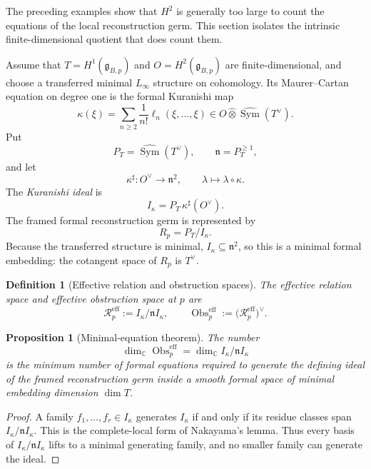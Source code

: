 \documentclass[11pt]{amsart}
\newtheorem{proposition}[theorem]{Proposition}
\newtheorem{definition}[theorem]{Definition}
\newcommand{\Obs}{\operatorname{Obs}}
\newcommand{\C}{\mathbb C}
\newcommand{\ghoch}{\mathfrak g}
\begin{document}
The preceding examples show that $H^2$ is generally too large to count the equations of the local reconstruction germ.  This section isolates the intrinsic finite-dimensional quotient that does count them.

Assume that $T=H^1(\ghoch_{B,p})$ and $O=H^2(\ghoch_{B,p})$ are finite-dimensional, and choose a transferred minimal $L_\infty$ structure on cohomology.  Its Maurer--Cartan equation on degree one is the formal Kuranishi map
\[
\kappa(\xi)
=
\sum_{n\ge2}\frac1{n!}\ell_n(\xi,\ldots,\xi)
\in O\widehat\otimes \widehat{\operatorname{Sym}}(T^\vee).
\]
Put
\[
P_T=\widehat{\operatorname{Sym}}(T^\vee),
\qquad
\mathfrak n=P_T^{\ge1},
\]
and let
\[
\kappa^\sharp:O^\vee\longrightarrow\mathfrak n^2,
\qquad
\lambda\longmapsto \lambda\circ\kappa.
\]
The \emph{Kuranishi ideal} is
\[
I_\kappa=P_T\,\kappa^\sharp(O^\vee).
\]
The framed formal reconstruction germ is represented by
\[
R_p=P_T/I_\kappa.
\]
Because the transferred structure is minimal, $I_\kappa\subseteq\mathfrak n^2$, so this is a minimal formal embedding: the cotangent space of $R_p$ is $T^\vee$.

\begin{definition}[Effective relation and obstruction spaces]\label{def:effective-obstruction}
The effective relation space and effective obstruction space at $p$ are
\[
\mathscr R^{\mathrm{eff}}_p
:=
I_\kappa/\mathfrak n I_\kappa,
\qquad
\Obs^{\mathrm{eff}}_p
:=
\bigl(\mathscr R^{\mathrm{eff}}_p\bigr)^\vee.
\]
\end{definition}

\begin{proposition}[Minimal-equation theorem]\label{prop:minimal-equations}
The number
\[
\dim_\C\Obs^{\mathrm{eff}}_p
=
\dim_\C I_\kappa/\mathfrak n I_\kappa
\]
is the minimum number of formal equations required to generate the defining ideal of the framed reconstruction germ inside a smooth formal space of minimal embedding dimension $\dim T$.
\end{proposition}

\begin{proof}
A family $f_1,\ldots,f_r\in I_\kappa$ generates $I_\kappa$ if and only if its residue classes span $I_\kappa/\mathfrak n I_\kappa$.  This is the complete-local form of Nakayama's lemma.  Thus every basis of $I_\kappa/\mathfrak n I_\kappa$ lifts to a minimal generating family, and no smaller family can generate the ideal.
\end{proof}
\end{document}
